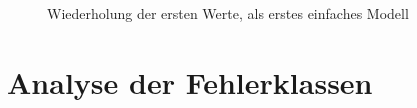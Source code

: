 \documentclass[
	12pt,
	a4paper,
	BCOR10mm,
	DIV14,
	listof=totoc,
	bibliography=totoc,
	headsepline
]{scrreprt}
\begin{document}
\begin{figure}
	\caption{Wiederholung der ersten Werte, als erstes einfaches Modell}
	\label{fig:periodicity100001}
\end{figure} 

\section{Analyse der Fehlerklassen}
\end{document}
